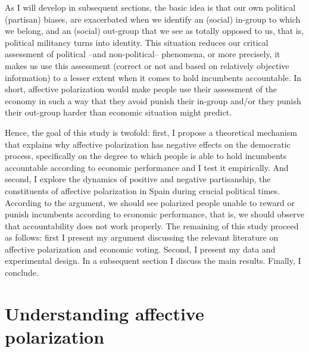 \documentclass[a4paper, svgnames]{article}
\begin{document}
As I will develop in subsequent sections, the basic idea is that our own political (partisan) biases, are exacerbated when we identify an (social) in-group to which we belong, and an (social) out-group that we see as totally opposed to us, that is, political militancy turns into identity. This situation reduces our critical assessment of political --and non-political-- phenomena, or more precisely, it makes us use this assessment (correct or not and based on relatively objective information) to a lesser extent when it comes to hold incumbents accountable. In short, affective polarization would make people use their assessment of the economy in such a way that they avoid punish their in-group and/or they punish their out-group harder than economic situation might predict.

Hence, the goal of this study is twofold: first, I propose a theoretical mechanism that explains why affective polarization has negative effects on the democratic process, specifically on the degree to which people is able to hold incumbents accountable according to economic performance and I test it empirically. And second, I explore the dynamics of positive and negative partisanship, the constituents of affective polarization in Spain during crucial political times. According to the argument, we should see polarized people unable to reward or punish incumbents according to economic performance, that is, we should observe that accountability does not work properly. The remaining of this study proceed as follows: first I present my argument discussing the relevant literature on affective polarization and economic voting. Second, I present my data and experimental design. In a subsequent section I discuss the main results. Finally, I conclude.

\section{Understanding affective polarization}
\label{affective polarization}
\end{document}
